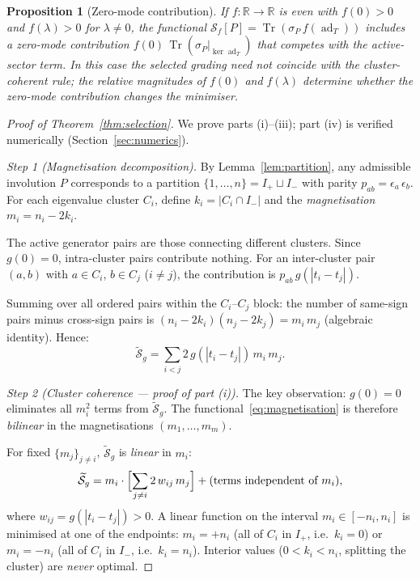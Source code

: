 \documentclass[11pt]{article}
\theoremstyle{plain}
\newtheorem{proposition}[theorem]{Proposition}
\theoremstyle{definition}
\theoremstyle{remark}
\newcommand{\ad}{\operatorname{ad}}
\newcommand{\Tr}{\operatorname{Tr}}
\begin{document}
\begin{proposition}[Zero-mode contribution]
\label{prop:zero-mode}
If $f : \mathbb{R} \to \mathbb{R}$ is even with $f(0) > 0$ and
$f(\lambda) > 0$ for $\lambda \ne 0$, the functional
$\mathcal{S}_f[P] = \Tr(\sigma_P\,f(\ad_T))$ includes a zero-mode
contribution $f(0)\,\Tr(\sigma_P|_{\ker\ad_T})$ that competes with
the active-sector term.  In this case the selected grading need not
coincide with the cluster-coherent rule; the relative magnitudes of
$f(0)$ and $f(\lambda)$ determine whether the zero-mode contribution
changes the minimiser.
\end{proposition}

\begin{proof}[Proof of Theorem~\ref{thm:selection}]
We prove parts (i)--(iii); part (iv) is verified numerically
(Section~\ref{sec:numerics}).

\emph{Step 1 (Magnetisation decomposition).}
By Lemma~\ref{lem:partition}, any admissible involution $P$
corresponds to a partition $\{1, \ldots, n\} = I_+ \sqcup I_-$
with parity $p_{ab} = \epsilon_a\,\epsilon_b$.  For each eigenvalue
cluster $C_i$, define $k_i = |C_i \cap I_-|$ and the
\emph{magnetisation} $m_i = n_i - 2k_i$.

The active generator pairs are those connecting different clusters.
Since $g(0) = 0$, intra-cluster pairs contribute nothing.  For
an inter-cluster pair $(a, b)$ with $a \in C_i$, $b \in C_j$
($i \ne j$), the contribution is
$p_{ab}\,g(|t_i - t_j|)$.

Summing over all ordered pairs within the $C_i$--$C_j$ block:
the number of same-sign pairs minus cross-sign pairs is
$(n_i - 2k_i)(n_j - 2k_j) = m_i\,m_j$ (algebraic identity).
Hence:
\begin{equation}\label{eq:magnetisation}
  \widetilde{\mathcal{S}}_g
  = \sum_{i < j} 2\,g(|t_i - t_j|)\,m_i\,m_j.
\end{equation}

\emph{Step 2 (Cluster coherence --- proof of part (i)).}
The key observation: $g(0) = 0$ eliminates all $m_i^2$ terms from
$\widetilde{\mathcal{S}}_g$.  The functional~\eqref{eq:magnetisation}
is therefore \emph{bilinear} in the magnetisations $(m_1, \ldots, m_m)$.

For fixed $\{m_j\}_{j \ne i}$,
$\widetilde{\mathcal{S}}_g$ is \emph{linear} in $m_i$:
\[
  \widetilde{\mathcal{S}}_g
  = m_i \cdot \Bigl[\sum_{j \ne i} 2\,w_{ij}\,m_j\Bigr]
  + (\text{terms independent of } m_i),
\]
where $w_{ij} = g(|t_i - t_j|) > 0$.
A linear function on the interval $m_i \in [-n_i, n_i]$ is minimised
at one of the endpoints: $m_i = +n_i$ (all of $C_i$ in $I_+$, i.e.\
$k_i = 0$) or $m_i = -n_i$ (all of $C_i$ in $I_-$, i.e.\ $k_i = n_i$).
Interior values ($0 < k_i < n_i$, splitting the cluster) are
\emph{never} optimal.


\end{proof}
\end{document}
